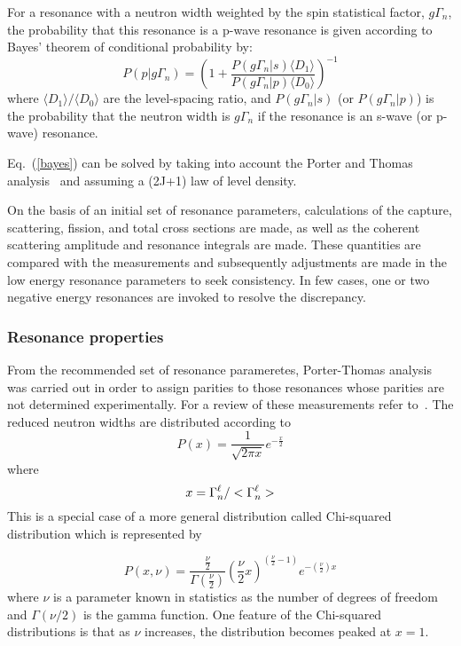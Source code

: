 \documentclass[twocolumn,amsmath,amssymb,10pt,groupedaddress,a4paper]{revtex4}
\begin{document}
For a resonance with a neutron width weighted by the spin statistical factor, $g\Gamma_n$, the probability that this resonance
is a p-wave resonance is given according to Bayes' theorem of conditional probability by:
\begin{equation}
P(p|g\Gamma_n)=\left(1+\frac{P(g\Gamma_n|s)\langle D_1\rangle}{P(g\Gamma_n|p)\langle D_0\rangle}\right)^{-1}
\label{bayes}
\end{equation}
\noindent where $\langle D_1\rangle/\langle D_0\rangle$ are the level-spacing ratio, and $P(g\Gamma_n|s)$ (or $P(g\Gamma_n|p)$)  is
the probability that the neutron width is $g\Gamma_n$ if the resonance is an s-wave (or p-wave) resonance.

Eq.~(\ref{bayes}) can be solved by taking into account the Porter and Thomas analysis~\cite{Porter:56} and assuming a (2J+1) law
of level density.

On the basis of an  initial set of resonance parameters, calculations of the
 capture, scattering, fission, and total cross sections are made, as well as
 the coherent scattering amplitude and resonance integrals are made. These
 quantities are compared with the measurements and subsequently adjustments
 are made in the low energy resonance parameters to seek consistency.
 In few cases, one or two negative energy resonances are  invoked to resolve
 the discrepancy.


\subsubsection{Resonance properties}
From the recommended set of resonance parameretes, Porter-Thomas analysis
 was carried out in order to assign parities to those resonances whose parities
 are not determined experimentally. For a review of these measurements refer
 to~\cite{Mughabghab:06}.
 The reduced neutron widths are distributed according to
\begin{equation}
P(x) = \frac{1}{\sqrt{2\pi x}} e^{-\frac{x}{2}}
\label{px}
\end{equation}
\noindent where
\begin{equation}
x = \Gamma_n^\ell/<\Gamma_n^\ell>   \notag
\end{equation}
This is a special case of a more general distribution called Chi-squared distribution which is represented by

\begin{equation}
P(x,\nu) = \frac{\frac{\nu}{2}}{\Gamma \left( \frac{\nu}{2} \right)} \left( \frac{\nu}{2}x \right)^{\left( \frac{\nu}{2} - 1 \right)}e^{-\left( \frac{\nu}{2} \right)x}
\label{pxnu}
\end{equation}
\noindent where $\nu$ is a parameter known in statistics as the number of
degrees of freedom and $\Gamma(\nu/2)$ is the gamma function. One feature of the Chi-squared distributions
is that as $\nu$ increases, the distribution becomes peaked at $x = 1$.
\end{document}
